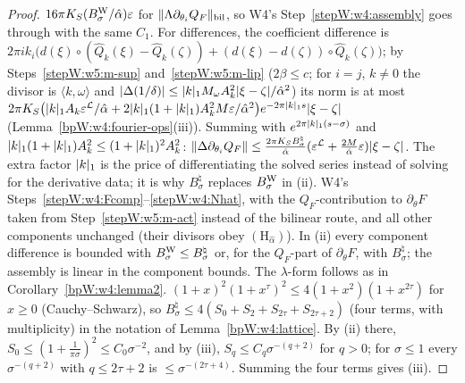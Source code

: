 \begin{proof}
$16\pi K_S(B^{\rm W}_\sigma/\hat\alpha)\varepsilon$ for $\lVert \Lambda\partial_{\theta_i}Q_F\rVert_{\rm bil}$, so W4's
Step~\ref{stepW:w4:assembly} goes through with the same $C_1$. For differences, the coefficient difference is
$2\pi ik_i\bigl(d(\xi)\circ(\hat Q_k(\xi)-\hat Q_k(\zeta))+(d(\xi)-d(\zeta))\circ\hat Q_k(\zeta)\bigr)$; by Steps~\ref{stepW:w5:m-sup}
and~\ref{stepW:w5:m-lip} ($2\beta\le c$; for $i=j$, $k\ne0$ the divisor is $\langle k,\omega\rangle$ and
$\lvert \Delta(1/\delta)\rvert\le\lvert k\rvert_1M_\omega A_k^2\lvert \xi-\zeta\rvert/\hat\alpha^2$) its norm is at most
$2\pi K_S\bigl(\lvert k\rvert_1A_k\varepsilon^{\mathcal L}/\hat\alpha+2\lvert k\rvert_1(1+\lvert k\rvert_1)A_k^2M\varepsilon/\hat\alpha^2\bigr)e^{-2\pi\lvert k\rvert_1s}\lvert \xi-\zeta\rvert$
(Lemma~\ref{bpW:w4:fourier-ops}(iii)). Summing with $e^{2\pi\lvert k\rvert_1(s-\sigma)}$ and $\lvert k\rvert_1(1+\lvert k\rvert_1)A_k^2\le(1+\lvert k\rvert_1)^2A_k^2$:
$\lVert \Delta\partial_{\theta_i}Q_F\rVert\le\frac{2\pi K_SB^\natural_\sigma}{\hat\alpha}(\varepsilon^{\mathcal L}+\frac{2M}{\hat\alpha}\varepsilon)\lvert \xi-\zeta\rvert$.
The extra factor $\lvert k\rvert_1$ is the price of differentiating the solved series instead of solving for the derivative data;
it is why $B^\natural_\sigma$ replaces $B^{\rm W}_\sigma$ in (ii).
\label{stepW:w5:m-ass} W4's Steps~\ref{stepW:w4:Fcomp}--\ref{stepW:w4:Nhat}, with the $Q_F$-contribution to
$\partial_\theta F$ taken from Step~\ref{stepW:w5:m-act} instead of the bilinear route, and all other components unchanged
(their divisors obey $(\mathrm H_{\hat\alpha})$). In (ii) every component difference is bounded with $B^{\rm W}_\sigma\le B^\natural_\sigma$
or, for the $Q_F$-part of $\partial_\theta F$, with $B^\natural_\sigma$; the assembly is linear in the component bounds. The
$\lambda$-form follows as in Corollary~\ref{bpW:w4:lemma2}.
\label{stepW:w5:m-const} $(1+x)^2(1+x^\tau)^2\le4(1+x^2)(1+x^{2\tau})$ for $x\ge0$ (Cauchy--Schwarz), so
$B^\natural_\sigma\le4(S_0+S_2+S_{2\tau}+S_{2\tau+2})$ (four terms, with multiplicity) in the notation of
Lemma~\ref{bpW:w4:lattice}. By (ii) there, $S_0\le(1+\frac1{\pi\sigma})^2\le C_0\sigma^{-2}$, and by (iii), $S_q\le C_q\sigma^{-(q+2)}$ for $q>0$;
for $\sigma\le1$ every $\sigma^{-(q+2)}$ with $q\le2\tau+2$ is $\le\sigma^{-(2\tau+4)}$. Summing the four terms gives (iii).
\end{proof}
